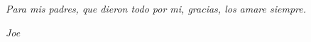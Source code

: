 \cleardoublepage
\vspace*{\fill}

\begin{center}
	\emph{Para mis padres, que dieron todo por mi, gracias, los amare siempre.}
\end{center}

\vspace{0.3cm}
\hspace{11cm}
\emph{Joe}

\vspace*{\fill}
